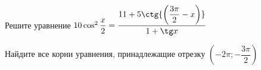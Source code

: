 \begin{ex}
	\begin{condition}
		\begin{enumcols}[label=\asbuk*)]
			\item Решите уравнение \( 10 \cos^2 {\dfrac{x}{2}} = \dfrac{11+5\ctg{\left(\dfrac{3\pi}{2}-x\right)}}{1 + \tg x} \)
			\item Найдите все корни уравнения, принадлежащие отрезку \( \left(-2\pi;-\dfrac{3\pi}{2}\right) \)
		\end{enumcols}
	\end{condition}
\end{ex}